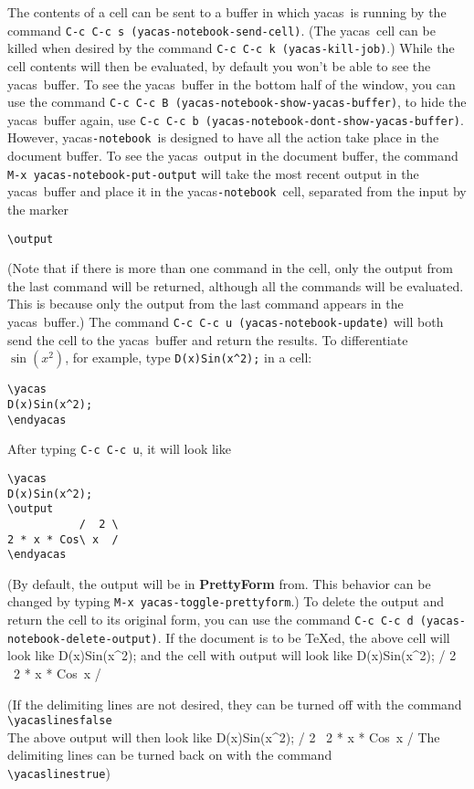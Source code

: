 \documentclass[12pt]{article}
\def\ys{\textsf{yacas}}
\def\yn{\textsf{yacas}\texttt{-notebook}}
\begin{document}
The contents of a cell can be sent to a buffer in which \ys\ is
running by the command \texttt{C-c C-c s (yacas-notebook-send-cell)}.  (The
\ys\ cell can be killed when desired by the command 
\texttt{C-c C-c k (yacas-kill-job)}.)  While the cell contents will
then be evaluated, by default you won't be able to see the \ys\
buffer.  To see the \ys\ buffer in the bottom half of the window,
you can use the command \texttt{C-c C-c B (yacas-notebook-show-yacas-buffer)},
to hide the \ys\ buffer again, use \texttt{C-c C-c b
(yacas-notebook-dont-show-yacas-buffer)}.  However, \yn\ is designed to
have all the action take place in the document buffer.  To see the
\ys\ output in the document buffer, the command \texttt{M-x
  yacas-notebook-put-output} will take the most recent output in the \ys\
buffer and place it in the \yn\ cell, separated from the input by
the marker
\begin{verbatim}
\output
\end{verbatim}
(Note that if there is more than one command in the cell, only the
output from the last command will be returned, although all the
commands will be evaluated.  This is because only the output from the
last command appears in the \ys\ buffer.)
The command \texttt{C-c C-c u (yacas-notebook-update)} will both send the cell
to the \ys\ buffer and return the results.  To differentiate
$\sin(x^2)$, for example, type \texttt{D(x)Sin(x\^{}2);} in a cell:
\begin{verbatim}
\yacas
D(x)Sin(x^2);
\endyacas
\end{verbatim}
After typing \texttt{C-c C-c u}, it will look like
\begin{verbatim}
\yacas
D(x)Sin(x^2);
\output
           /  2 \
2 * x * Cos\ x  /
\endyacas
\end{verbatim}
(By default, the output will be in \textbf{PrettyForm} from.  This
behavior can be changed by typing \texttt{M-x yacas-toggle-prettyform}.)
To delete the output and return the cell to its original form, you can
use the command \texttt{C-c C-c d (yacas-notebook-delete-output)}.  If the
document is to be \TeX{}ed, the above cell will look like
\yacas
D(x)Sin(x^2);
\endyacas
and the cell with output will look like
\yacas
D(x)Sin(x^2);
\output
           /  2 \
2 * x * Cos\ x  /
\endyacas

(If the delimiting lines are not desired, they can be turned off with
the command\\
\verb+\yacaslinesfalse+\\
The above output will then look like
\yacaslinesfalse
\yacas
D(x)Sin(x^2);
\output
           /  2 \
2 * x * Cos\ x  /
\endyacas
\yacaslinestrue
The delimiting lines can be turned back on with the command \\
\verb+\yacaslinestrue+)
\end{document}
